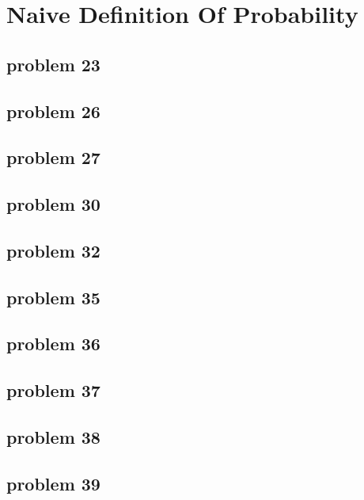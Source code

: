 \section{Naive Definition Of Probability}

\subsection{problem 23}


\subsection{problem 26}


\subsection{problem 27}


\subsection{problem 30}


\subsection{problem 32}


\subsection{problem 35}


\subsection{problem 36}


\subsection{problem 37}


\subsection{problem 38}


\subsection{problem 39}
